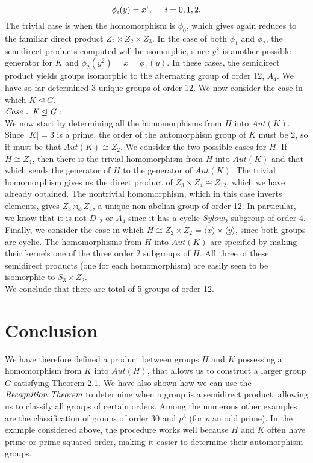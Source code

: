 \documentclass[11pt]{article}
\newcommand{\ns}{\mathrel{\unlhd}}
\begin{document}
\begin{equation}
\phi_i(y) = x^i, \hspace{0.5cm}  i = 0,1,2.
\end{equation} 
The trivial case is when the homomorphism is $\phi_0$, which gives again reduces to the familiar direct product $Z_2 \times Z_2 \times Z_3$. In the case of both $\phi_1$ and $\phi_2$, the semidirect products computed will be isomorphic, since $y^2$ is another possible generator for $K$ and $\phi_2(y^2) = x = \phi_1(y)$. In these cases, the semidirect product yields groups isomorphic to the alternating group of order 12, $A_4$. We have so far determined 3 unique groups of order 12. We now consider the case in which $K \ns G$. 
\\
\newline
$\emph{Case :}$ $\emph{K} \ns \emph{G}$ : \\
\indent
We now start by determining all the homomorphisms from $H$ into $Aut(K)$. Since $|K| = 3$ is a prime, the order of the automorphism group of $K$ must be $2$, so it must be that $Aut(K) \cong Z_2$. We consider the two possible cases for $H$. If $H \cong Z_4$, then there is the trivial homomorphism from $H$ into $Aut(K)$ and that which sends the generator of $H$ to the generator of $Aut(K)$. The trivial homomorphism gives us the direct product of $Z_3 \times Z_4 \cong Z_{12}$, which we have already obtained. The nontrivial homomorphism, which in this case inverts elements, gives $Z_3 \rtimes_{\phi} Z_4$, a unique non-abelian group of order 12. In particular, we know that it is not $D_12$ or $A_4$ since it has a cyclic $Sylow_2$ subgroup of order 4. 
\\
\indent
Finally, we consider the case in which $H \cong Z_2 \times Z_2 = \langle x \rangle \times \langle y \rangle$, since both groups are cyclic. The homomorphisms from $H$ into $Aut(K)$ are specified by making their kernels one of the three order 2 subgroups of $H$. All three of these semidirect products (one for each homomorphism) are easily seen to be isomorphic to $S_3 \times Z_2$.
\\
\indent 
We conclude that there are total of 5 groups of order 12. 
\section{Conclusion}
We have therefore defined a product between groups $H$ and $K$ possessing a homomorphism from $K$ into $Aut(H)$, that allows us to construct a larger group $G$ satisfying Theorem 2.1. We have also shown how we can use the $\emph{Recognition Theorem}$ to determine when a group is a semidirect product, allowing us to classify all groups of certain orders. Among the numerous other examples are the classification of groups of order 30 and $p^3$ (for $p$ an odd prime). In the example considered above, the procedure works well because $H$ and $K$ often have prime or prime squared order, making it easier to determine their automorphism groups.
\end{document}
